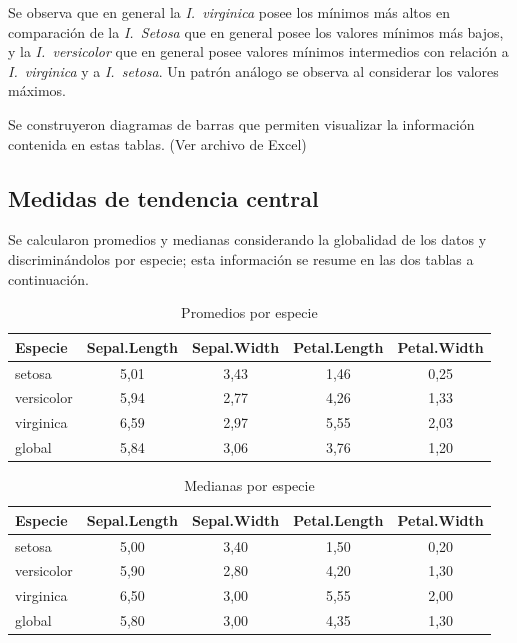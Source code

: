 \documentclass[12pt,a4paper]{article}
\begin{document}
Se observa que en general la \textit{I.~virginica} posee los mínimos más altos en comparación de la \textit{I.~Setosa} que en general posee los valores mínimos más bajos, y la \textit{I.~versicolor} que en general posee valores mínimos intermedios con relación a \textit{I.~virginica} y a \textit{I.~setosa}. Un patrón análogo se observa al considerar los valores máximos.

Se construyeron diagramas de barras que permiten visualizar la información contenida en estas tablas. (Ver archivo de Excel)

\subsection{Medidas de tendencia central}

Se calcularon promedios y medianas considerando la globalidad de los datos y discriminándolos por especie; esta información se resume en las dos tablas a continuación.

\begin{table}[h!]
\centering
\caption{Promedios por especie}
\label{fig:promedios}
\begin{tabular}{lcccc}
\toprule
\textbf{Especie} & \textbf{Sepal.Length} & \textbf{Sepal.Width} & \textbf{Petal.Length} & \textbf{Petal.Width} \\
\midrule
setosa     & 5,01 & 3,43 & 1,46 & 0,25 \\
versicolor & 5,94 & 2,77 & 4,26 & 1,33 \\
virginica  & 6,59 & 2,97 & 5,55 & 2,03 \\
global     & 5,84 & 3,06 & 3,76 & 1,20 \\
\bottomrule
\end{tabular}
\end{table}

\begin{table}[h!]
\centering
\caption{Medianas por especie}
\label{fig:medianas}
\begin{tabular}{lcccc}
\toprule
\textbf{Especie} & \textbf{Sepal.Length} & \textbf{Sepal.Width} & \textbf{Petal.Length} & \textbf{Petal.Width} \\
\midrule
setosa     & 5,00 & 3,40 & 1,50 & 0,20 \\
versicolor & 5,90 & 2,80 & 4,20 & 1,30 \\
virginica  & 6,50 & 3,00 & 5,55 & 2,00 \\
global     & 5,80 & 3,00 & 4,35 & 1,30 \\
\bottomrule
\end{tabular}
\end{table}
\end{document}
